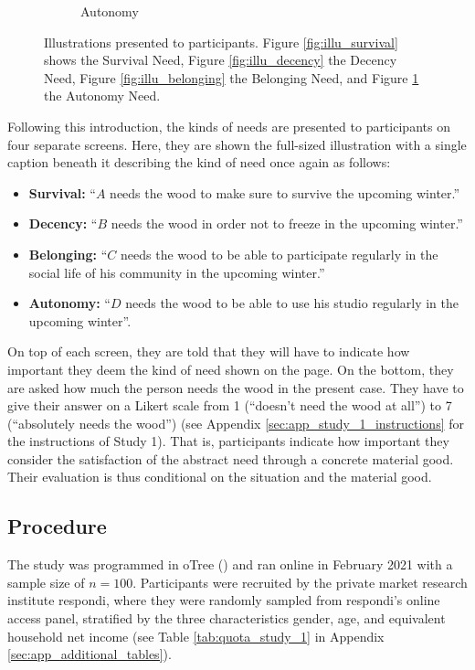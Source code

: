 \documentclass[egregdoesnotlikesansseriftitles]{scrartcl}
\begin{document}
\begin{figure}[ht!]
\begin{subfigure}[t]{0.45\textwidth}
      \caption{Autonomy}\label{fig:illu_autonomy}
   \end{subfigure}
   \caption{Illustrations presented to participants. Figure \ref{fig:illu_survival} shows the Survival Need, Figure \ref{fig:illu_decency} the Decency Need, Figure \ref{fig:illu_belonging} the Belonging Need, and Figure \ref{fig:illu_autonomy} the Autonomy Need.}\label{fig:illu}
\end{figure}

Following this introduction, the kinds of needs are presented to participants on four separate screens.
Here, they are shown the full-sized illustration with a single caption beneath it describing the kind of need once again as follows:

\begin{itemize}
   \item \textbf{Survival:} ``$A$ needs the wood to make sure to survive the upcoming winter.''
   \item \textbf{Decency:} ``$B$ needs the wood in order not to freeze in the upcoming winter.''
   \item \textbf{Belonging:} ``$C$ needs the wood to be able to participate regularly in the social life of his community in the upcoming winter.''
   \item \textbf{Autonomy:} ``$D$ needs the wood to be able to use his studio regularly in the upcoming winter''.
\end{itemize}

On top of each screen, they are told that they will have to indicate how important they deem the kind of need shown on the page.
On the bottom, they are asked how much the person needs the wood in the present case.
They have to give their answer on a Likert scale from 1 (``doesn't need the wood at all'') to 7 (``absolutely needs the wood'') (see Appendix \ref{sec:app_study_1_instructions} for the instructions of Study 1).
That is, participants indicate how important they consider the satisfaction of the abstract need through a concrete material good. Their evaluation is thus conditional on the situation and the material good.

\subsection{Procedure}\label{sec:study_1_procedure}
The study was programmed in oTree (\citealt{chen_otree_2016}) and ran online in February 2021 with a sample size of $n = 100$.
Participants were recruited by the private market research institute respondi, where they were randomly sampled from respondi's online access panel, stratified by the three characteristics gender, age, and equivalent household net income (see Table \ref{tab:quota_study_1} in Appendix \ref{sec:app_additional_tables}).
\end{document}
